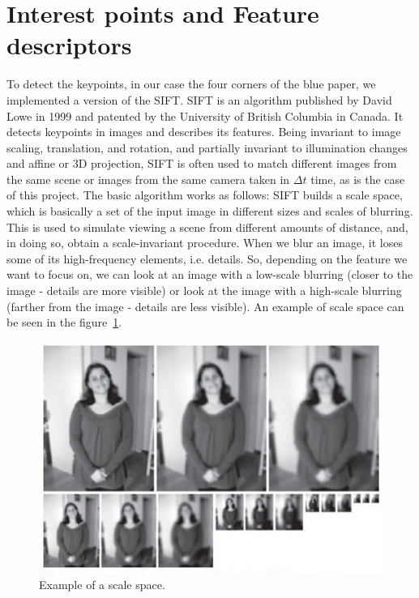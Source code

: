 \documentclass[]{IEEEtran}
\begin{document}
  \section{Interest points and Feature descriptors}
  To detect the keypoints, in our case the four corners of the blue paper, we implemented a version of the SIFT. SIFT is an algorithm published by David Lowe in 1999 and patented by the University of British Columbia in Canada. It detects keypoints in images and describes its features. Being invariant to image scaling, translation, and rotation, and partially invariant to illumination changes and affine or 3D projection, SIFT is often used to match different images from the same scene or images from the same camera taken in $\Delta t$ time, as is the case of this project. The basic algorithm works as follows: SIFT builds a scale space, which is basically a set of the input image in different sizes and scales of blurring. This is used to simulate viewing a scene from different amounts of distance, and, in doing so, obtain a scale-invariant procedure. When we blur an image, it loses some of its high-frequency elements, i.e. details. So, depending on the feature we want to focus on, we can look at an image with a low-scale blurring (closer to the image - details are more visible) or look at the image with a high-scale blurring (farther from the image - details are less visible). An example of scale space can be seen in the figure~\ref{fig:scale_space}.

\begin{figure}[h]
  \includegraphics[width=\linewidth]{./figures/sift/scale_space.jpg}
  \caption{Example of a scale space.}
  \label{fig:scale_space}
\end{figure}
\end{document}

